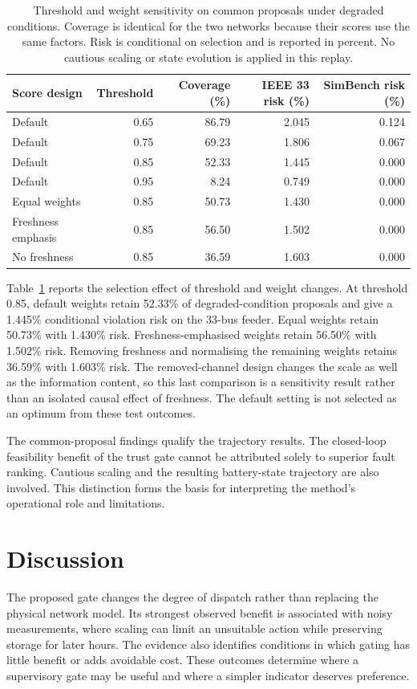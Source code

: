 \documentclass[11pt,a4paper]{article}
\begin{document}
\begin{table}[t]\centering\small
\caption{Threshold and weight sensitivity on common proposals under degraded conditions. Coverage is identical for the two networks because their scores use the same factors. Risk is conditional on selection and is reported in percent. No cautious scaling or state evolution is applied in this replay.}\label{tab:sensitivity}
\begin{tabular}{lrrrr}
\toprule
Score design & Threshold & Coverage (\%) & IEEE 33 risk (\%) & SimBench risk (\%)\\\midrule
Default & 0.65 & 86.79 & 2.045 & 0.124 \\
Default & 0.75 & 69.23 & 1.806 & 0.067 \\
Default & 0.85 & 52.33 & 1.445 & 0.000 \\
Default & 0.95 & 8.24 & 0.749 & 0.000 \\
Equal weights & 0.85 & 50.73 & 1.430 & 0.000 \\
Freshness emphasis & 0.85 & 56.50 & 1.502 & 0.000 \\
No freshness & 0.85 & 36.59 & 1.603 & 0.000 \\
\bottomrule\end{tabular}\end{table}

Table~\ref{tab:sensitivity} reports the selection effect of threshold and weight changes. At threshold 0.85, default weights retain 52.33\% of degraded-condition proposals and give a 1.445\% conditional violation risk on the 33-bus feeder. Equal weights retain 50.73\% with 1.430\% risk. Freshness-emphasised weights retain 56.50\% with 1.502\% risk. Removing freshness and normalising the remaining weights retains 36.59\% with 1.603\% risk. The removed-channel design changes the scale as well as the information content, so this last comparison is a sensitivity result rather than an isolated causal effect of freshness. The default setting is not selected as an optimum from these test outcomes.

The common-proposal findings qualify the trajectory results. The closed-loop feasibility benefit of the trust gate cannot be attributed solely to superior fault ranking. Cautious scaling and the resulting battery-state trajectory are also involved. This distinction forms the basis for interpreting the method's operational role and limitations.


\section{Discussion}\label{sec:discussion}
The proposed gate changes the degree of dispatch rather than replacing the physical network model. Its strongest observed benefit is associated with noisy measurements, where scaling can limit an unsuitable action while preserving storage for later hours. The evidence also identifies conditions in which gating has little benefit or adds avoidable cost. These outcomes determine where a supervisory gate may be useful and where a simpler indicator deserves preference.
\end{document}
